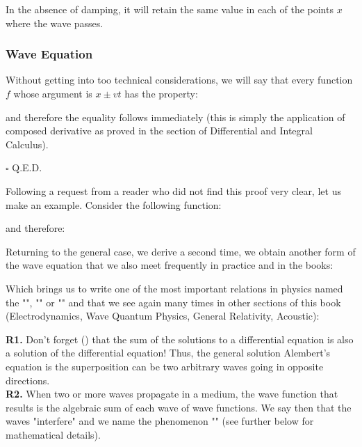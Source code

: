 	In the absence of damping, it will retain the same value in each of the points $x$ where the wave passes.
	
	\subsubsection{Wave Equation}
	\begin{theorem}
	Without getting into too technical considerations, we will say that every function $f$ whose argument is $x \pm vt$ has the property:
	\end{theorem}
	\begin{dem}
		
		and therefore the equality follows immediately (this is simply the application of composed derivative as proved in the section of Differential and Integral Calculus).
		\begin{flushright}
			$\square$  Q.E.D.
		\end{flushright}
		Following a request from a reader who did not find this proof very clear, let us make an example. Consider the following function:
		
		and therefore:
		
	\end{dem}
	Returning to the general case, we derive a second time, we obtain another form of the wave equation that we also meet frequently in practice and in the books:
	
	Which brings us to write one of the most important relations in physics named the "", "" or "" and that we see again many times in other sections of this book (Electrodynamics, Wave Quantum Physics, General Relativity, Acoustic):
	
	\begin{tcolorbox}[title=Remarks,colframe=black,arc=10pt]
	\textbf{R1.} Don't forget () that the sum of the solutions to a differential equation is also a solution of the differential equation! Thus, the general solution Alembert's equation is the superposition can be two arbitrary waves going in opposite directions.\\
	
	\textbf{R2.} When two or more waves propagate in a medium, the wave function that results is the algebraic sum of each wave of wave functions. We say then that the waves "interfere" and we name the phenomenon "" (see further below for mathematical details).
	\end{tcolorbox}
	
